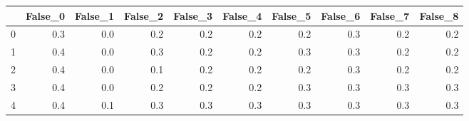 \begin{tabular}{lrrrrrrrrr}
\toprule
{} &  False\_0 &  False\_1 &  False\_2 &  False\_3 &  False\_4 &  False\_5 &  False\_6 &  False\_7 &  False\_8 \\ \hline
\midrule
0 &      0.3 &      0.0 &      0.2 &      0.2 &      0.2 &      0.2 &      0.3 &      0.2 &      0.2 \\ \hline
1 &      0.4 &      0.0 &      0.3 &      0.2 &      0.2 &      0.3 &      0.3 &      0.2 &      0.2 \\ \hline
2 &      0.4 &      0.0 &      0.1 &      0.2 &      0.2 &      0.2 &      0.3 &      0.2 &      0.2 \\ \hline
3 &      0.4 &      0.0 &      0.2 &      0.2 &      0.2 &      0.3 &      0.3 &      0.3 &      0.3 \\ \hline
4 &      0.4 &      0.1 &      0.3 &      0.3 &      0.3 &      0.3 &      0.3 &      0.3 &      0.3 \\ \hline
\bottomrule
\end{tabular}
